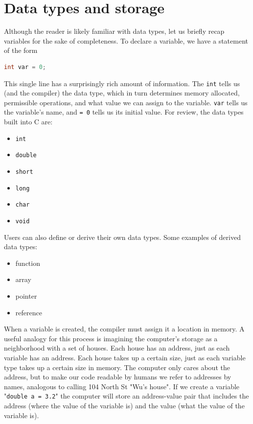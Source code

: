 \documentclass[nobib]{tufte-handout}
\begin{document}
\section{Data types and storage}
Although the reader is likely familiar with data types, let us 
briefly recap variables for the sake of completeness. To declare a 
variable, we have a statement of the form 
\begin{lstlisting}[language=C,caption=Variable]
   int var = 0;
\end{lstlisting}
This single line has a surprisingly rich amount of information.
The \texttt{int} tells us (and the compiler) the data type, which
in turn determines memory allocated, permissible operations, 
and what value we can assign to the variable.
\texttt{var} tells us the variable's name, and \texttt{= 0} tells us its
initial value. For review, the data types built into C are:
\begin{itemize}
   \item \texttt{int}
   \item \texttt{double}
   \item \texttt{short}
   \item \texttt{long}
   \item \texttt{char}
   \item \texttt{void}
\end{itemize}
Users can also define or derive their own data types. Some examples
of derived data types:
\begin{itemize}
   \item function
   \item array
   \item pointer
   \item reference
\end{itemize}
When a variable is created, the compiler must assign it a 
location in memory. A useful analogy for this process is 
imagining the computer's storage as a neighborhood with a 
set of houses. Each house has an address, just as each variable 
has an address. Each house takes
up a certain size, just as each variable type takes up a certain 
size in memory. The computer only cares about the address, but
to make our code readable by humans we refer to addresses by names, 
analogous to calling 104 North St "Wu's house". If we create a variable 
"\texttt{double a = 3.2}" the computer will store an address-value pair that includes
the address (where the value of the variable is) and the value (what the value
of the variable is).
\end{document}
